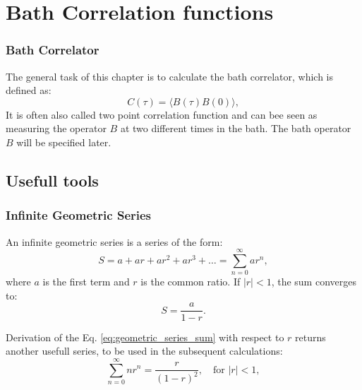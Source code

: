 
\chapter{Bath Correlation functions} %

\label{Chapter_calc_extra_stuff} %

\subsection{Bath Correlator}
\label{subsec:bath_correlator}

The general task of this chapter is to calculate the  bath correlator, which is defined as:
\begin{equation} \label{eq:bath_correlator}
C(\tau) = \langle B(\tau) B(0) \rangle,
\end{equation}
It is often also called two point correlation function and can bee seen as measuring the operator \( B \) at two different times in the bath.
The bath operator \( B \) will be specified later.

\section{Usefull tools}

\subsection{Infinite Geometric Series}
An infinite geometric series is a series of the form:
\begin{equation} \label{eq:infinite_geometric_series}
S = a + ar + ar^2 + ar^3 + \dots = \sum_{n=0}^{\infty} ar^n,
\end{equation}
where \(a\) is the first term and \(r\) is the common ratio. If \(|r| < 1\), the sum converges to:
\begin{equation} \label{eq:geometric_series_sum}
S = \frac{a}{1 - r}.
\end{equation}

Derivation of the Eq. \eqref{eq:geometric_series_sum} with respect to $ r $ returns another usefull series, to be used in the subsequent calculations:
\begin{equation} \label{eq:derivation_geometric_sum}
\sum_{n=0}^{\infty} n r^n = \frac{r}{(1-r)^2}, \quad \text{for } |r| < 1,
\end{equation}


